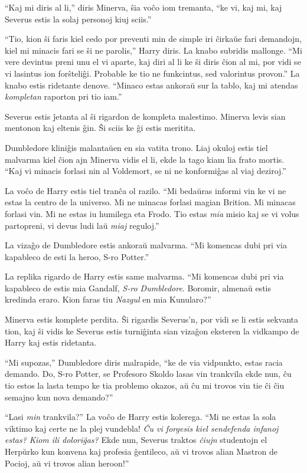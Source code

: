 ``Kaj mi diris al li,'' diris Minerva, ŝia voĉo iom tremanta, ``ke vi,
kaj mi, kaj Severus estis la solaj personoj kiuj sciis.''

``Tio, kion ŝi faris kiel cedo por preventi min de simple iri ĉirkaŭe
fari demandojn, kiel mi minacis fari se ŝi ne parolis,'' Harry
diris. La knabo subridis mallonge. ``Mi vere devintus preni unu el vi
aparte, kaj diri al li ke ŝi diris ĉion al mi, por vidi se vi lasintus
ion forŝteliĝi. Probable ke tio ne funkcintus, sed valorintus
provon.'' La knabo estis ridetante denove. ``Minaco estas ankoraŭ sur
la tablo, kaj mi atendas \emph{kompletan} raporton pri tio iam.''

Severus estis ĵetanta al ŝi rigardon de kompleta malestimo. Minerva
levis sian mentonon kaj eltenis ĝin. Ŝi sciis ke ĝi estis meritita.

Dumbledore kliniĝis malantaŭen en sia vatita trono. Liaj okuloj estis
tiel malvarma kiel ĉion ajn Minerva vidis el li, ekde la tago kiam lia
frato mortis. ``Kaj vi minacis forlasi nin al Voldemort, se ni ne
konformiĝas al viaj deziroj.''

La voĉo de Harry estis tiel tranĉa ol razilo. ``Mi bedaŭras informi
vin ke vi ne estas la centro de la universo. Mi ne minacas forlasi
magian Brition. Mi minacas forlasi vin. Mi ne estas iu humilega eta
Frodo. Tio estas \emph{mia} misio kaj se vi volus partopreni, vi devus
ludi laŭ \emph{miaj} reguloj.''

La vizaĝo de Dumbledore estis ankoraŭ malvarma. ``Mi komencas dubi pri
via kapableco de esti la heroo, S-ro Potter.''

La replika rigardo de Harry estis same malvarma. ``Mi komencas dubi
pri via kapableco de estis mia Gandalf, \emph{S-ro
Dumbledore}. Boromir, almenaŭ estis kredinda eraro. Kion faras tiu
\emph{Nazgul} en mia Kunularo?''

Minerva estis komplete perdita. Ŝi rigardis Severus'n, por vidi se li
estis sekvanta tion, kaj ŝi vidis ke Severus estis turniĝinta sian
vizaĝon eksteren la vidkampo de Harry kaj estis ridetanta.

``Mi supozas,'' Dumbledore diris malrapide, ``ke de via vidpunkto,
estas racia demando. Do, S-ro Potter, se Profesoro Skoldo lasas vin
trankvila ekde nun, ĉu tio estos la lasta tempo ke tia problemo
okazos, aŭ ĉu mi trovos vin tie ĉi ĉiu semajno kun nova demando?''

``Lasi \emph{min} trankvila?'' La voĉo de Harry estis kolerega. ``Mi
ne estas la sola viktimo kaj certe ne la plej vundebla! \emph{Ĉu vi
forgesis kiel sendefenda infanoj estas? Kiom ili doloriĝas?} Ekde nun,
Severus traktos \emph{ĉiujn} studentojn el Herpŭrko kun konvena kaj
profesia ĝentileco, aŭ vi trovos alian Mastron de Pocioj, aŭ vi trovos
alian heroon!''


